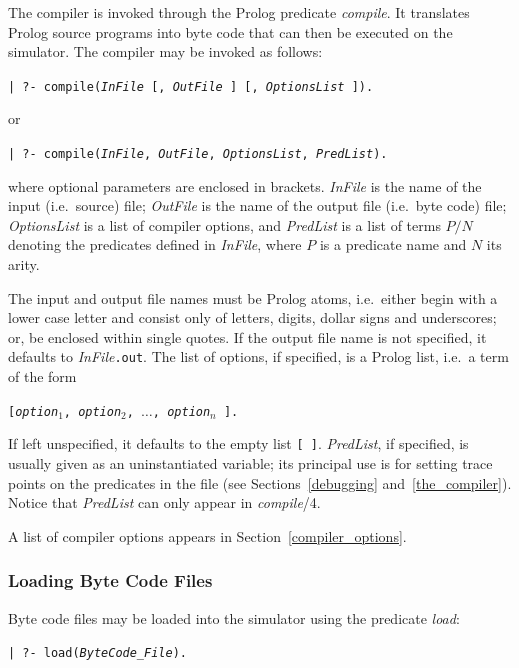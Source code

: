 The compiler is invoked through the Prolog predicate {\em compile}.
It translates Prolog source programs into byte code
that can then be executed on the simulator.
The compiler may be invoked as follows:
\begin{center}
{\tt | ?- compile({\em InFile} [, {\em OutFile} ] [, {\em OptionsList} ]).}
\end{center}
or
\begin{center}
{\tt | ?- compile({\em InFile}, {\em OutFile}, {\em OptionsList}, {\em PredList}).}
\end{center}

where optional parameters are enclosed in brackets.
{\em InFile} is the name of the input (i.e.\ source) file;
{\em OutFile} is the name of the output file (i.e.\ byte code) file;
{\em OptionsList} is a list of compiler options,
and {\em PredList} is a list of terms $P/N$ denoting the
predicates defined in {\em InFile},
where $P$ is a predicate name and $N$ its arity.

The input and output file names must be Prolog atoms,
i.e.\ either begin with a lower case letter and consist only of letters, digits,
dollar signs and underscores; or, be enclosed within single quotes.
If the output file name is not specified, it defaults to {\em InFile}{\tt .out}.
The list of options, if specified, is a Prolog list, i.e.\ a term of the form
\begin{center}
{\tt [{\em option}$_1$, {\em option}$_2$, $\ldots$, {\em option}$_n$ ].}
\end{center}

If left unspecified, it defaults to the empty list {\tt [\,]}.
{\em PredList}, if specified, is usually given as an uninstantiated variable;
its principal use is for setting trace points on the predicates in the file
(see Sections~\ref{debugging} and~\ref{the_compiler}).
Notice that {\em PredList} can only appear in {\em compile}/4.

A list of compiler options appears in Section~\ref{compiler_options}.

\subsubsection{Loading Byte Code Files}
Byte code files may be loaded into the simulator using the
predicate {\em load}:
\begin{center}
{\tt | ?- load({\em ByteCode\_File}).}
\end{center}

